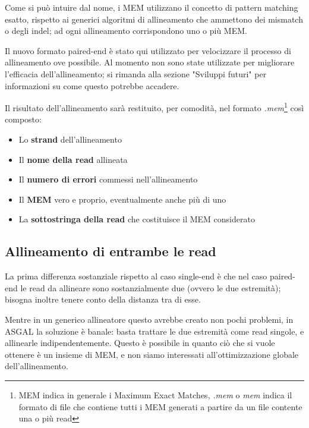 Come si può intuire dal nome, i MEM utilizzano il concetto di pattern matching esatto, rispetto  ai generici algoritmi di allineamento che ammettono dei mismatch o degli indel; ad ogni allineamento corrispondono uno o più MEM.

Il nuovo formato paired-end è stato qui utilizzato per velocizzare il processo di allineamento ove possibile. Al momento non sono state utilizzate per migliorare l'efficacia dell'allineamento; si rimanda alla sezione "Sviluppi futuri" per informazioni su come questo potrebbe accadere.

\newpage

Il risultato dell'allineamento sarà restituito, per comodità, nel formato \textit{.mem}\footnote{MEM indica in generale i Maximum Exact Matches, \textit{.mem} o \textit{mem} indica il formato di file che contiene tutti i MEM generati a partire da un file contente una o più read} così composto:

\begin{itemize}
	\item Lo \textbf{strand} dell'allineamento
	\item	Il \textbf{nome della read} allineata
	\item Il \textbf{numero di errori} commessi nell'allineamento 
	\item Il \textbf{MEM} vero e proprio, eventualmente anche più di uno
	\item La \textbf{sottostringa della read} che costituisce il MEM considerato
\end{itemize}

\subsection{Allineamento di entrambe le read}
La prima differenza sostanziale rispetto al caso single-end è che nel caso paired-end le read da allineare sono sostanzialmente due (ovvero le due estremità); bisogna inoltre tenere conto della distanza tra di esse. 

Mentre in un generico allineatore questo avrebbe creato non pochi problemi, in ASGAL la soluzione è banale: basta trattare le due estremità come read singole, e allinearle indipendentemente. Questo è possibile in quanto ciò che si vuole ottenere è un insieme di MEM, e non siamo interessati all'ottimizzazione globale dell'allineamento. %

